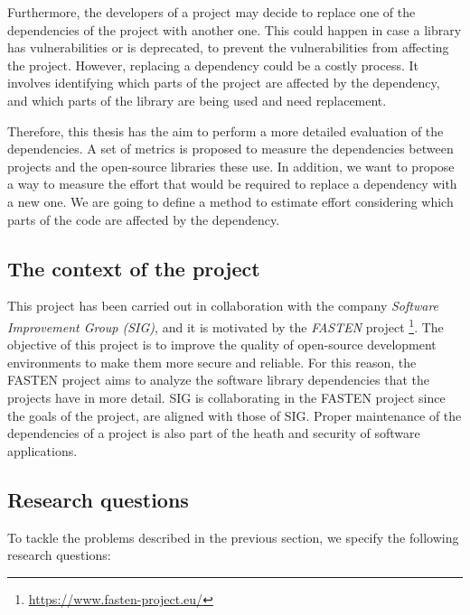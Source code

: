 Furthermore, the developers of a project may decide to replace one of the dependencies of the project with another one. This could happen in case a library has vulnerabilities or is deprecated, to prevent the vulnerabilities from affecting the project. However, replacing a dependency could be a costly process. It involves identifying which parts of the project are affected by the dependency, and which parts of the library are being used and need replacement. 

\blankl
Therefore, this thesis has the aim to perform a more detailed evaluation of the dependencies.  A set of metrics is proposed to measure the dependencies between projects and the open-source  libraries these use. \todo{}In addition, we want to propose a way to measure the effort that would be required to replace a dependency with a new one. We are going to define a method to estimate effort considering which parts of the code are affected by the dependency.

\subsection{The context of the project}
This project has been carried out in collaboration with the company \textit{Software Improvement Group (SIG)}, and it is motivated by the \textit{FASTEN} project \footnote{\url{https://www.fasten-project.eu/}}. The objective of this project is to improve the quality of open-source development environments to make them more secure and reliable. For this reason, the FASTEN project aims to analyze the software library dependencies that the projects have in more detail. SIG is collaborating in the FASTEN project since the goals of the project, are aligned with those of SIG.   Proper maintenance of the dependencies of a project is also part of the heath and security of software applications. 

\subsection{Research questions} %
To tackle the problems described in the previous section, we specify the following research questions:

